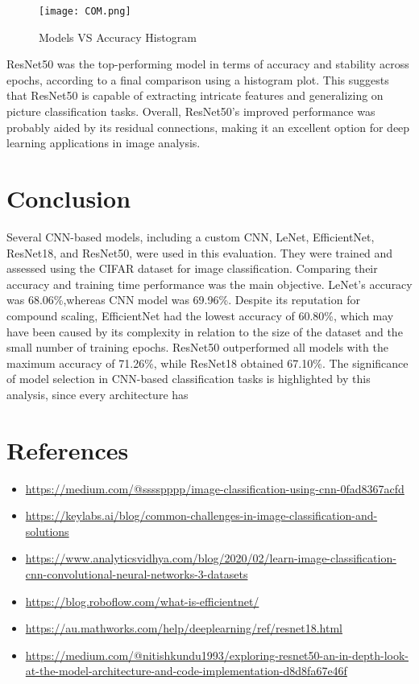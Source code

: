 \documentclass[10pt,twocolumn,letterpaper]{article}
\begin{document}
\begin{figure}[h]
    \centering
    \texttt{[image: COM.png]}
    \caption{Models VS Accuracy Histogram}
    \label{fig:example_image}
\end{figure}
\text{}
ResNet50 was the top-performing model in terms of accuracy and stability across epochs, according to a final comparison using a histogram plot. This suggests that ResNet50 is capable of extracting intricate features and generalizing on picture classification tasks. Overall, ResNet50's improved performance was probably aided by its residual connections, making it an excellent option for deep learning applications in image analysis.

\section{Conclusion}
Several CNN-based models, including a custom CNN, LeNet, EfficientNet, ResNet18, and ResNet50, were used in this evaluation. They were trained and assessed using the CIFAR dataset for image classification. Comparing their accuracy and training time performance was the main objective. LeNet's accuracy was 68.06\%,whereas CNN model was 69.96\%. Despite its reputation for compound scaling, EfficientNet had the lowest accuracy of 60.80\%, which may have been caused by its complexity in relation to the size of the dataset and the small number of training epochs. ResNet50 outperformed all models with the maximum accuracy of 71.26\%, while ResNet18 obtained 67.10\%. The significance of model selection in CNN-based classification tasks is highlighted by this analysis, since every architecture has 

\section*{References}
{\small
\begin{itemize}
\item \url{https://medium.com/@sssspppp/image-classification-using-cnn-0fad8367acfd}
\item \url{https://keylabs.ai/blog/common-challenges-in-image-classification-and-solutions}
\item \url{https://www.analyticsvidhya.com/blog/2020/02/learn-image-classification-cnn-convolutional-neural-networks-3-datasets}
\item \url{https://blog.roboflow.com/what-is-efficientnet/}
\item \url{https://au.mathworks.com/help/deeplearning/ref/resnet18.html}
\item \url{https://medium.com/@nitishkundu1993/exploring-resnet50-an-in-depth-look-at-the-model-architecture-and-code-implementation-d8d8fa67e46f}
\end{itemize}
}
\end{document}
